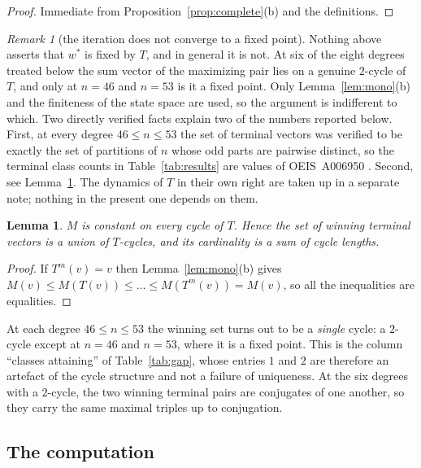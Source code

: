 \documentclass[11pt]{article}
\newtheorem{lemma}[theorem]{Lemma}
\theoremstyle{remark}
\newtheorem{remark}[theorem]{Remark}
\begin{document}
\begin{proof}
Immediate from Proposition~\ref{prop:complete}(b) and the definitions.
\end{proof}

\begin{remark}[the iteration does not converge to a fixed point]\label{rem:cycles}
Nothing above asserts that $w^\ast$ is fixed by $T$, and in general it is not. At six of
the eight degrees treated below the sum vector of the maximizing pair lies on a genuine
$2$-cycle of $T$, and only at $n=46$ and $n=53$ is it a fixed point. Only
Lemma~\ref{lem:mono}(b) and the finiteness of the state space are used, so the argument
is indifferent to which. Two directly verified facts explain two of the numbers reported
below. First, at every degree $46\le n\le 53$ the set of terminal vectors was verified
to be exactly the set of partitions of $n$ whose odd parts are pairwise distinct, so the
terminal class counts in Table~\ref{tab:results} are values of OEIS~A006950 \cite{OEIS}.
Second, see Lemma~\ref{lem:cycleconst}. The dynamics of $T$ in their own right are taken
up in a separate note; nothing in the present one depends on them.
\end{remark}

\begin{lemma}\label{lem:cycleconst}
$M$ is constant on every cycle of $T$. Hence the set of winning terminal vectors is a
union of $T$-cycles, and its cardinality is a sum of cycle lengths.
\end{lemma}

\begin{proof}
If $T^m(v)=v$ then Lemma~\ref{lem:mono}(b) gives
$M(v)\le M(T(v))\le\dots\le M(T^m(v))=M(v)$, so all the inequalities are equalities.
\end{proof}

At each degree $46\le n\le 53$ the winning set turns out to be a \emph{single} cycle:
a $2$-cycle except at $n=46$ and $n=53$, where it is a fixed point. This is the column
``classes attaining'' of Table~\ref{tab:gap}, whose entries $1$ and $2$ are therefore an
artefact of the cycle structure and not a failure of uniqueness. At the six degrees with
a $2$-cycle, the two winning terminal pairs are conjugates of one another, so they carry
the same maximal triples up to conjugation.

\subsection*{The computation}
\end{document}
